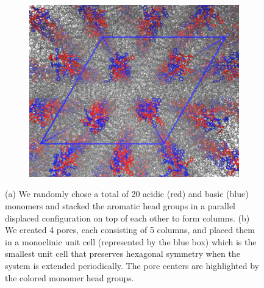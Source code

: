 \documentclass{article}
\begin{document}
\begin{figure}
  \begin{subfigure}{0.56\textwidth}
  \includegraphics[width=\textwidth]{unitcell.pdf}
  \caption{}\label{fig:unitcell}
  \end{subfigure}
  \caption{(a) We randomly chose a total of 20 acidic (red) and basic (blue) 
  monomers and stacked the aromatic head groups in a parallel displaced 
  configuration on top of each other to form columns. (b) We created 4 pores, 
  each consisting of 5 columns, and placed them in a monoclinic unit cell (represented
  by the blue box) which is the smallest unit cell that preserves hexagonal 
  symmetry when the system is extended periodically. The pore centers are
  highlighted by the colored monomer head groups.}\label{fig:system_setup}
  \end{figure} 
  
\end{document}

